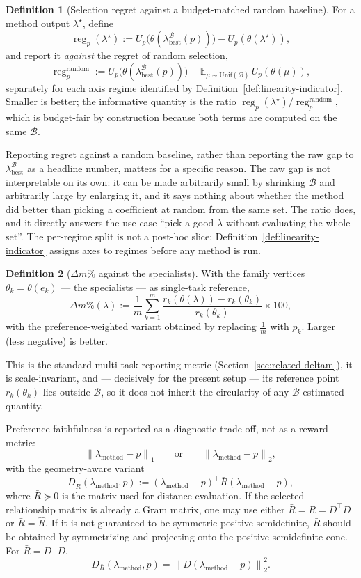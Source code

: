 \documentclass[12pt,a4paper]{report}
\newcommand{\1}{\mathbf{1}}
\newcommand{\norm}[1]{\left\lVert #1 \right\rVert}
\newcommand{\Bset}{\mathcal{B}}
\DeclareMathOperator{\reg}{reg}
\theoremstyle{definition}
\newtheorem{definition}{Definition}
\begin{document}
\begin{definition}[Selection regret against a budget-matched random baseline]
\label{def:regret}
For a method output \(\lambda^\star\), define
\[
\reg_p(\lambda^\star):=U_p\bigl(\theta(\lambda_{\mathrm{best}}^{\Bset}(p))\bigr)-U_p(\theta(\lambda^\star)),
\]
and report it \emph{against} the regret of random selection,
\[
\reg_p^{\mathrm{random}}:=U_p\bigl(\theta(\lambda_{\mathrm{best}}^{\Bset}(p))\bigr)-\mathbb{E}_{\mu\sim\mathrm{Unif}(\Bset)}\,U_p(\theta(\mu)),
\]
separately for each axis regime identified by Definition~\ref{def:linearity-indicator}. Smaller is better; the informative quantity is the ratio \(\reg_p(\lambda^\star)/\reg_p^{\mathrm{random}}\), which is budget-fair by construction because both terms are computed on the same \(\Bset\).
\end{definition}

Reporting regret against a random baseline, rather than reporting the raw gap to \(\lambda_{\mathrm{best}}^{\Bset}\) as a headline number, matters for a specific reason. The raw gap is not interpretable on its own: it can be made arbitrarily small by shrinking \(\Bset\) and arbitrarily large by enlarging it, and it says nothing about whether the method did better than picking a coefficient at random from the same set. The ratio does, and it directly answers the use case ``pick a good \(\lambda\) without evaluating the whole set''. The per-regime split is not a post-hoc slice: Definition~\ref{def:linearity-indicator} assigns axes to regimes before any method is run.

\begin{definition}[\(\Delta m\%\) against the specialists]
\label{def:delta-m}
With the family vertices \(\theta_k=\theta(e_k)\) --- the specialists --- as single-task reference,
\[
\Delta m\%(\lambda):=\frac{1}{m}\sum_{k=1}^{m}\frac{r_k(\theta(\lambda))-r_k(\theta_k)}{r_k(\theta_k)}\times 100,
\]
with the preference-weighted variant obtained by replacing \(\tfrac1m\) with \(p_k\). Larger (less negative) is better.
\end{definition}

This is the standard multi-task reporting metric (Section~\ref{sec:related-deltam}), it is scale-invariant, and --- decisively for the present setup --- its reference point \(r_k(\theta_k)\) lies outside \(\Bset\), so it does not inherit the circularity of any \(\Bset\)-estimated quantity.

Preference faithfulness is reported as a diagnostic trade-off, not as a reward metric:
\[
\norm{\lambda_{\mathrm{method}}-p}_1
\qquad\text{or}\qquad
\norm{\lambda_{\mathrm{method}}-p}_2 ,
\]
with the geometry-aware variant
\[
D_{\bar R}(\lambda_{\mathrm{method}},p):=(\lambda_{\mathrm{method}}-p)^\top \bar R(\lambda_{\mathrm{method}}-p),
\]
where \(\bar R\succeq 0\) is the matrix used for distance evaluation. If the selected relationship matrix is already a Gram matrix, one may use either \(\bar R=R=D^\top D\) or \(\bar R=\hat R\). If it is not guaranteed to be symmetric positive semidefinite, \(\bar R\) should be obtained by symmetrizing and projecting onto the positive semidefinite cone. For \(\bar R=D^\top D\),
\[
D_{\bar R}(\lambda_{\mathrm{method}},p)=\norm{D(\lambda_{\mathrm{method}}-p)}_2^2 .
\]
\end{document}
